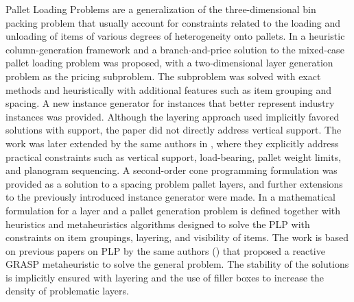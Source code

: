 Pallet Loading Problems are a generalization of the three-dimensional bin packing problem that usually account for constraints related to the loading and unloading of items of various degrees of heterogeneity onto pallets.
In \cite{elhedhli2019three} a heuristic column-generation framework and a branch-and-price solution to the mixed-case pallet loading problem was proposed, with a two-dimensional layer generation problem as the pricing subproblem.
The subproblem was solved with exact methods and heuristically with additional features such as item grouping and spacing.
A new instance generator for instances that better represent industry instances was provided. Although the layering approach used implicitly favored solutions with support, the paper did not directly address vertical support.
The work was later extended by the same authors in \cite{GZARA20201062}, where they explicitly address practical constraints such as vertical support, load-bearing, pallet weight limits, and planogram sequencing.
A second-order cone programming formulation was provided as a solution to a spacing problem pallet layers, and further extensions to the previously introduced instance generator were made.
In \cite{Calzavara2021} a mathematical formulation for a layer and a pallet generation problem is defined together with heuristics and metaheuristics algorithms designed to solve the PLP with constraints on item groupings, layering, and visibility of items.
The work is based on previous papers on PLP by the same authors (\cite{Iori2020a, Iori2020b, Iori2021}) that proposed a reactive GRASP metaheuristic to solve the general problem.
The stability of the solutions is implicitly ensured with layering and the use of filler boxes to increase the density of problematic layers.